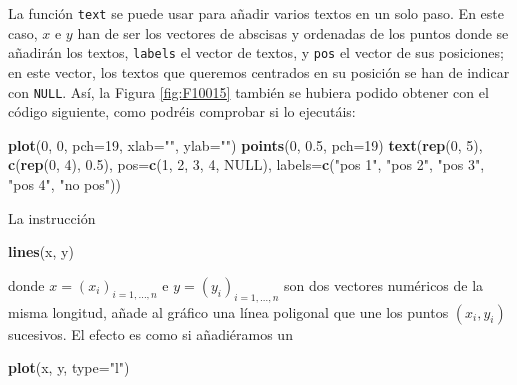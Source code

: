 \documentclass[]{book}
\newenvironment{Shaded}{\begin{snugshade}}{\end{snugshade}}
\newcommand{\DataTypeTok}[1]{\textcolor[rgb]{0.13,0.29,0.53}{#1}}
\newcommand{\DecValTok}[1]{\textcolor[rgb]{0.00,0.00,0.81}{#1}}
\newcommand{\FloatTok}[1]{\textcolor[rgb]{0.00,0.00,0.81}{#1}}
\newcommand{\KeywordTok}[1]{\textcolor[rgb]{0.13,0.29,0.53}{\textbf{#1}}}
\newcommand{\NormalTok}[1]{#1}
\newcommand{\OtherTok}[1]{\textcolor[rgb]{0.56,0.35,0.01}{#1}}
\newcommand{\StringTok}[1]{\textcolor[rgb]{0.31,0.60,0.02}{#1}}
\theoremstyle{definition}
\theoremstyle{definition}
\theoremstyle{definition}
\theoremstyle{remark}
\begin{document}
La función \texttt{text} se puede usar para añadir varios textos en un solo paso. En este caso, \(x\) e \(y\) han de ser los vectores de abscisas y ordenadas de los puntos donde se añadirán los textos, \texttt{labels} el vector de textos, y \texttt{pos} el vector de sus posiciones; en este vector, los textos que queremos centrados en su posición se han de indicar con \texttt{NULL}. Así, la Figura \ref{fig:F10015} también se hubiera podido obtener con el código siguiente, como podréis comprobar si lo ejecutáis:

\begin{Shaded}
\begin{Highlighting}[]
\KeywordTok{plot}\NormalTok{(}\DecValTok{0}\NormalTok{, }\DecValTok{0}\NormalTok{, }\DataTypeTok{pch=}\DecValTok{19}\NormalTok{, }\DataTypeTok{xlab=}\StringTok{""}\NormalTok{, }\DataTypeTok{ylab=}\StringTok{""}\NormalTok{)}
\KeywordTok{points}\NormalTok{(}\DecValTok{0}\NormalTok{, }\FloatTok{0.5}\NormalTok{, }\DataTypeTok{pch=}\DecValTok{19}\NormalTok{)}
\KeywordTok{text}\NormalTok{(}\KeywordTok{rep}\NormalTok{(}\DecValTok{0}\NormalTok{, }\DecValTok{5}\NormalTok{), }\KeywordTok{c}\NormalTok{(}\KeywordTok{rep}\NormalTok{(}\DecValTok{0}\NormalTok{, }\DecValTok{4}\NormalTok{), }\FloatTok{0.5}\NormalTok{), }\DataTypeTok{pos=}\KeywordTok{c}\NormalTok{(}\DecValTok{1}\NormalTok{, }\DecValTok{2}\NormalTok{, }\DecValTok{3}\NormalTok{, }\DecValTok{4}\NormalTok{, }\OtherTok{NULL}\NormalTok{), }
     \DataTypeTok{labels=}\KeywordTok{c}\NormalTok{(}\StringTok{"pos 1"}\NormalTok{, }\StringTok{"pos 2"}\NormalTok{, }\StringTok{"pos 3"}\NormalTok{, }\StringTok{"pos 4"}\NormalTok{, }\StringTok{"no pos"}\NormalTok{))}
\end{Highlighting}
\end{Shaded}

La instrucción

\begin{Shaded}
\begin{Highlighting}[]
\KeywordTok{lines}\NormalTok{(x, y)}
\end{Highlighting}
\end{Shaded}

donde \(x=(x_i)_{i=1, \ldots, n}\) e \(y=(y_i)_{i=1, \ldots, n}\) son dos vectores numéricos de la misma longitud, añade al gráfico una línea poligonal que une los puntos \((x_i, y_i)\) sucesivos. El efecto es como si añadiéramos un

\begin{Shaded}
\begin{Highlighting}[]
\KeywordTok{plot}\NormalTok{(x, y, }\DataTypeTok{type=}\StringTok{"l"}\NormalTok{)}
\end{Highlighting}
\end{Shaded}
\end{document}
